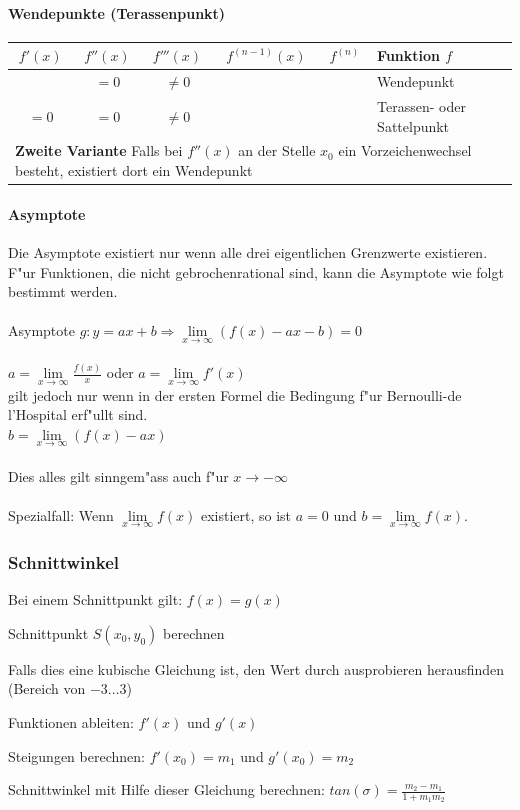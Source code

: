 \paragraph{Wendepunkte (Terassenpunkt)}
	\begin{tabular}{|c|c|c|c|c|l|}
		\hline $f'(x)$ & $f''(x)$ & $f'''(x)$ & $f^{(n-1)}(x)$ & $f^{(n)}$ & Funktion $f$ \\
		\hline\ & $= 0$ & $\neq 0$ & & & Wendepunkt\\
		\hline $= 0$ & $= 0$ & $\neq 0$ & & & Terassen- oder Sattelpunkt\\
		\hline\multicolumn{6}{|l|}{\textbf{Zweite Variante}  Falls bei $f''(x)$ an der Stelle $x_0$ ein Vorzeichenwechsel besteht, existiert dort ein Wendepunkt} \\\hline
	\end{tabular}

\paragraph{Asymptote}
	Die Asymptote existiert nur wenn alle drei eigentlichen Grenzwerte existieren.
	F"ur Funktionen, die nicht gebrochenrational sind, kann die Asymptote wie folgt bestimmt werden. \\
	\ \\ %
 	Asymptote  $g: y = ax + b \Rightarrow \lim\limits_{x \rightarrow \infty}(f(x) - ax - b) = 0$\\
	\ \\ %
	$a = \lim\limits_{x \rightarrow \infty} \frac{f(x)}{x} $ oder $a = \lim\limits_{x \rightarrow \infty} f'(x) \qquad $\\
	gilt jedoch nur wenn in der ersten Formel die Bedingung f"ur Bernoulli-de l'Hospital erf"ullt sind.\\
	$b = \lim\limits_{x \rightarrow \infty} (f(x) - ax) $\\
	\ \\ %
	Dies alles gilt sinngem"ass auch f"ur $x \rightarrow -\infty$\\
	\ \\ %
	Spezialfall: Wenn $\lim\limits_{x \rightarrow \infty} f(x)$ existiert, so ist $a = 0$ und $b = \lim\limits_{x \rightarrow \infty} f(x)$.

\subsubsection{Schnittwinkel}
	\begin{compactenum}
		\item Bei einem Schnittpunkt gilt: $f(x)=g(x)$
		\item Schnittpunkt $S(x_0,y_0)$ berechnen
		\item Falls dies eine kubische Gleichung ist, den Wert durch ausprobieren herausfinden (Bereich von $-3 \dots 3$)
		\item Funktionen ableiten: $f'(x)$ und $g'(x)$
		\item Steigungen berechnen: $f'(x_0)=m_1$ und $g'(x_0)=m_2$
		\item Schnittwinkel mit Hilfe dieser Gleichung berechnen: $tan(\sigma)=\frac{m_2-m_1}{1+m_1m_2}$
	\end{compactenum}

